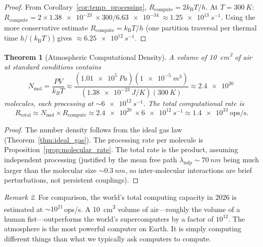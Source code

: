 \documentclass[11pt,twocolumn,a4paper]{article}
\theoremstyle{plain}
\newtheorem{theorem}{Theorem}[section]
\theoremstyle{definition}
\theoremstyle{remark}
\newtheorem{remark}[theorem]{Remark}
\newcommand{\kB}{k_{\mathrm{B}}}
\newcommand{\Rcompute}{R_{\mathrm{compute}}}
\begin{document}
\begin{proof}
From Corollary~\ref{cor:temp_processing}, $\Rcompute = 2\kB T / h$. At $T = \SI{300}{K}$: $\Rcompute = 2 \times \SI{1.38e-23}{} \times 300 / \SI{6.63e-34}{} \approx \SI{1.25e13}{s^{-1}}$. Using the more conservative estimate $\Rcompute = \kB T/h$ (one partition traversal per thermal time $h/(\kB T)$) gives $\approx \SI{6.25e12}{s^{-1}}$.
\end{proof}

\begin{theorem}[Atmospheric Computational Density]
\label{thm:atmos_compute}
A volume of \SI{10}{cm^3} of air at standard conditions contains
\begin{equation}
N_{\mathrm{mol}} = \frac{P V}{k_B T} \approx \frac{(\SI{1.01e5}{Pa})(\SI{1e-5}{m^3})}{(\SI{1.38e-23}{J/K})(\SI{300}{K})} \approx \SI{2.4e20}{}
\label{eq:Nmol}
\end{equation}
molecules, each processing at $\sim \SI{6e12}{s^{-1}}$. The total computational rate is
\begin{equation}
R_{\mathrm{total}} \approx N_{\mathrm{mol}} \times \Rcompute \approx \SI{2.4e20}{} \times \SI{6e12}{s^{-1}} \approx \SI{1.4e33}{\mathrm{ops/s}}.
\label{eq:Rtotal}
\end{equation}
\end{theorem}

\begin{proof}
The number density follows from the ideal gas law (Theorem~\ref{thm:ideal_gas}). The processing rate per molecule is Proposition~\ref{prop:molecular_rate}. The total rate is the product, assuming independent processing (justified by the mean free path $\lambda_{\mathrm{mfp}} \sim \SI{70}{nm}$ being much larger than the molecular size $\sim \SI{0.3}{nm}$, so inter-molecular interactions are brief perturbations, not persistent couplings).
\end{proof}

\begin{remark}
For comparison, the world's total computing capacity in 2026 is estimated at $\sim 10^{21}$\,ops/s. A \SI{10}{cm^3} volume of air---roughly the volume of a human fist---outperforms the world's supercomputers by a factor of $10^{12}$. The atmosphere is the most powerful computer on Earth. It is simply computing different things than what we typically ask computers to compute.
\end{remark}
\end{document}
